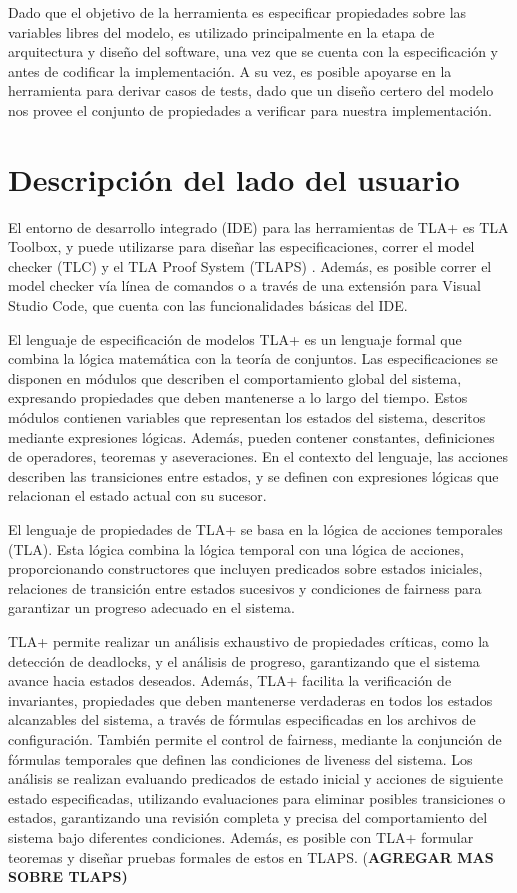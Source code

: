 \documentclass[runningheads]{llncs}
\begin{document}
Dado que el objetivo de la herramienta es especificar propiedades sobre las variables libres del modelo, es utilizado principalmente en la etapa de arquitectura y diseño del software, una vez que se cuenta con la especificación y antes de codificar la implementación. A su vez, es posible apoyarse en la herramienta para derivar casos de tests, dado que un diseño certero del modelo nos provee el conjunto de propiedades a verificar para nuestra implementación.

\section{Descripción del lado del usuario}
El entorno de desarrollo integrado (IDE) para las herramientas de TLA+ es TLA Toolbox, y puede utilizarse para diseñar las especificaciones, correr el model checker (TLC) y el TLA Proof System (TLAPS) \cite{tla}. Además, es posible correr el model checker vía línea de comandos \cite{book} o a través de una extensión para Visual Studio Code, que cuenta con las funcionalidades básicas del IDE.

El lenguaje de especificación de modelos TLA+ es un lenguaje formal que combina la lógica matemática con la teoría de conjuntos. Las especificaciones se disponen en módulos que describen el comportamiento global del sistema, expresando propiedades que deben mantenerse a lo largo del tiempo. Estos módulos contienen variables que representan los estados del sistema, descritos mediante expresiones lógicas. Además, pueden contener constantes, definiciones de operadores, teoremas y aseveraciones. En el contexto del lenguaje, las acciones describen las transiciones entre estados, y se definen con expresiones lógicas que relacionan el estado actual con su sucesor.

El lenguaje de propiedades de TLA+ se basa en la lógica de acciones temporales (TLA). Esta lógica combina la lógica temporal con una lógica de acciones, proporcionando constructores que incluyen predicados sobre estados iniciales, relaciones de transición entre estados sucesivos y condiciones de fairness para garantizar un progreso adecuado en el sistema.

TLA+ permite realizar un análisis exhaustivo de propiedades críticas, como la detección de deadlocks, y el análisis de progreso, garantizando que el sistema avance hacia estados deseados. Además, TLA+ facilita la verificación de invariantes, propiedades que deben mantenerse verdaderas en todos los estados alcanzables del sistema, a través de fórmulas especificadas en los archivos de configuración. También permite el control de fairness, mediante la conjunción de fórmulas temporales que definen las condiciones de liveness del sistema. Los análisis se realizan evaluando predicados de estado inicial y acciones de siguiente estado especificadas, utilizando evaluaciones para eliminar posibles transiciones o estados, garantizando una revisión completa y precisa del comportamiento del sistema bajo diferentes condiciones. Además, es posible con TLA+ formular teoremas y diseñar pruebas formales de estos en TLAPS. (\textbf{AGREGAR MAS SOBRE TLAPS)}
\end{document}
